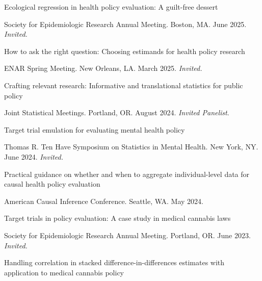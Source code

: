 \documentclass[letterpaper,11pt]{article} %
\begin{document}
	\begin{etaremune}
            \item Ecological regression in health policy evaluation: A guilt-free dessert
            \begin{conflist}
                \item Society for Epidemiologic Research Annual Meeting. Boston, MA. June 2025. \textit{Invited.}
            \end{conflist}
            \item How to ask the right question: Choosing estimands for health policy research
            \begin{conflist}
                \item ENAR Spring Meeting. New Orleans, LA. March 2025. \textit{Invited.}
            \end{conflist}
                \item Crafting relevant research: Informative and translational statistics for public policy
            \begin{conflist}
                \item Joint Statistical Meetings. Portland, OR. August 2024. \textit{Invited Panelist}.
            \end{conflist}
            \item Target trial emulation for evaluating mental health policy
            \begin{conflist}
                \item Thomas R. Ten Have Symposium on Statistics in Mental Health. New York, NY. June 2024. \textit{Invited.}
            \end{conflist}
            \item Practical guidance on whether and when to aggregate individual-level data for causal health policy evaluation
            \begin{conflist}
                \item American Causal Inference Conference. Seattle, WA. May 2024.
            \end{conflist}
		\item Target trials in policy evaluation: A case study in medical cannabis laws
		\begin{conflist}
			\item Society for Epidemiologic Research Annual Meeting. Portland, OR. June 2023. \textit{Invited.}
		\end{conflist}
		\item Handling correlation in stacked difference-in-differences estimates with application to medical cannabis policy

\end{etaremune}
\end{document}

